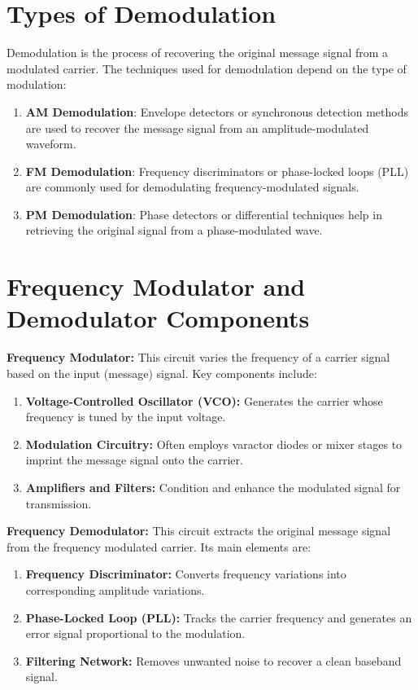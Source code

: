 \documentclass[a4paper,12pt]{article}
\begin{document}
		\section{Types of Demodulation}
		Demodulation is the process of recovering the original message signal from a modulated carrier. The techniques used for demodulation depend on the type of modulation:
		
		\begin{enumerate}
			\item \textbf{AM Demodulation}: Envelope detectors or synchronous detection methods are used to recover the message signal from an amplitude-modulated waveform.
			\item \textbf{FM Demodulation}: Frequency discriminators or phase-locked loops (PLL) are commonly used for demodulating frequency-modulated signals.
			\item \textbf{PM Demodulation}: Phase detectors or differential techniques help in retrieving the original signal from a phase-modulated wave.
		\end{enumerate}
		
		\section{Frequency Modulator and Demodulator Components}
		
		\textbf{Frequency Modulator:} This circuit varies the frequency of a carrier signal based on the input (message) signal. Key components include:
		\begin{enumerate}
			\item \textbf{Voltage-Controlled Oscillator (VCO):} Generates the carrier whose frequency is tuned by the input voltage.
			\item \textbf{Modulation Circuitry:} Often employs varactor diodes or mixer stages to imprint the message signal onto the carrier.
			\item \textbf{Amplifiers and Filters:} Condition and enhance the modulated signal for transmission.
		\end{enumerate}
		
		\textbf{Frequency Demodulator:} This circuit extracts the original message signal from the frequency modulated carrier. Its main elements are:
		\begin{enumerate}
			\item \textbf{Frequency Discriminator:} Converts frequency variations into corresponding amplitude variations.
			\item \textbf{Phase-Locked Loop (PLL):} Tracks the carrier frequency and generates an error signal proportional to the modulation.
			\item \textbf{Filtering Network:} Removes unwanted noise to recover a clean baseband signal.
		\end{enumerate}
		
\end{document}
